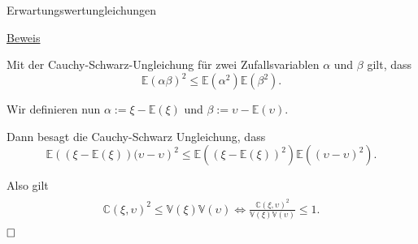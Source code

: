 \documentclass[
  8pt,
  ignorenonframetext,
]{beamer}
\newcommand{\ups}{\upsilon}
\begin{document}
\begin{frame}{Erwartungswertungleichungen}
\protect\hypertarget{erwartungswertungleichungen-2}{}
\footnotesize

\underline{Beweis}

Mit der Cauchy-Schwarz-Ungleichung für zwei Zufallsvariablen \(\alpha\)
und \(\beta\) gilt, dass \begin{equation}
\mathbb{E}(\alpha\beta)^2 \le \mathbb{E}\left(\alpha^2\right)\mathbb{E}\left(\beta^2\right).
\end{equation}

Wir definieren nun \(\alpha := \xi -\mathbb{E}(\xi)\) und
\(\beta := \ups - \mathbb{E}(\ups)\).

Dann besagt die Cauchy-Schwarz Ungleichung, dass \begin{equation}
\mathbb{E}\left((\xi -\mathbb{E}(\xi))(\ups-\mathbb{\ups}\right)^2
\le  \mathbb{E}\left((\xi -\mathbb{E}(\xi))^2 \right) \mathbb{E}\left((\ups-\mathbb{\ups})^2 \right).
\end{equation}

Also gilt \begin{align}
\begin{split}
\mathbb{C}(\xi,\ups)^2
\le  \mathbb{V}(\xi)\mathbb{V}(\ups)
\Leftrightarrow \frac{\mathbb{C}(\xi,\ups)^2}{\mathbb{V}(\xi)\mathbb{V}(\ups)}
\le 1.
\end{split}
\end{align} \(\hfill \Box\)
\end{frame}
\end{document}
